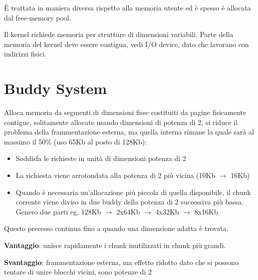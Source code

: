 È trattata in maniera diversa rispetto alla memoria utente ed è spesso è allocata dal free-memory pool.

Il kernel richiede memoria per strutture di dimensioni variabili.
Parte della memoria del kernel deve essere contigua, vedi I/O device, dato che lavorano
con indirizzi fisici.

\section{Buddy System}

Alloca memoria da segmenti di dimensioni fisse costituiti da pagine fisicamente
contigue, solitamente allocate usando dimensioni di potenza di 2, si riduce il problema della
frammentazione esterna, ma quella interna rimane la quale sarà al massimo il 50\% (uso 65Kb al posto di 128Kb):

\begin{itemize}
  \item Soddisfa le richieste in unità di dimensioni potenza di 2
  \item La richiesta viene arrotondata alla potenza di 2 più vicina (10Kb $\to$ 16Kb)
  \item Quando è necessaria un'allocazione più piccola di quella disponibile,
        il chunk corrente viene diviso in due buddy della potenza di 2 successiva
        più bassa. Genero due parti eg. 128Kb $\to$ 2x64Kb $\to$ 4x32Kb $\to$ 8x16Kb
\end{itemize}

Questo precesso continua fino a quando una dimensione adatta è trovata.

\textbf{Vantaggio}: unisce rapidamente i chunk inutilizzati in chunk più grandi.\newline

\textbf{Svantaggio}: frammentazione esterna, ma effetto ridotto dato che si possono tentare di unire blocchi vicini, sono potenze di 2

